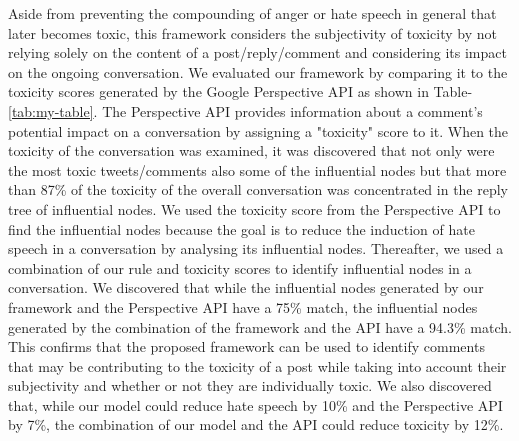 Aside from preventing the compounding of anger or hate speech in general that later becomes toxic, this framework considers the subjectivity of toxicity by not relying solely on the content of a post/reply/comment and considering its impact on the ongoing conversation. We evaluated our framework by comparing it to the toxicity scores generated by the Google Perspective API \cite{bworld} as shown in Table-\ref{tab:my-table}. The Perspective API provides information about a comment's potential impact on a conversation by assigning a "toxicity" score to it. When the toxicity of the conversation was examined, it was discovered that not only were the most toxic tweets/comments also some of the influential nodes but that more than 87\% of the toxicity of the overall conversation was concentrated in the reply tree of influential nodes. We used the toxicity score from the Perspective API \cite{bworld} to find the influential nodes because the goal is to reduce the induction of hate speech in a conversation by analysing its influential nodes. Thereafter, we used a combination of our rule and toxicity scores to identify influential nodes in a conversation. We discovered that while the influential nodes generated by our framework and the Perspective API have a 75\% match, the influential nodes generated by the combination of the framework and the API have a 94.3\% match. 
This confirms that the proposed framework can be used to identify comments that may be contributing to the toxicity of a post while taking into account their subjectivity and whether or not they are individually toxic.
We also discovered that, while our model could reduce hate speech by 10\% and the Perspective API by 7\%, the combination of our model and the API could reduce toxicity by 12\%.
 

